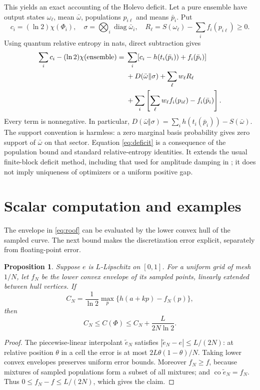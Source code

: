 \documentclass[11pt]{article}
\newtheorem{proposition}[theorem]{Proposition}
\newcommand{\co}{\operatorname{co}}
\begin{document}
This yields an exact accounting of the Holevo deficit. Let a pure ensemble have output states $\omega_\ell$, mean $\bar\omega$, populations $p_{i\ell}$ and means $\bar p_i$. Put
\[
 c_i=(\ln2)\chi(\Phi_i),\quad
 \sigma=\bigotimes_i\operatorname{diag}\bar\omega_i,\quad
 R_\ell=S(\omega_\ell)-\sum_i f_i(p_{i\ell})\ge0.
\]
Using quantum relative entropy in nats, direct subtraction gives
\begin{align}\label{eq:deficit}
 \sum_i c_i-(\ln2)\chi(\text{ensemble})
 ={}&\sum_i[c_i-h(t_i(\bar p_i))+f_i(\bar p_i)]\notag\\
 &+D(\bar\omega\Vert\sigma)+\sum_\ell w_\ell R_\ell\\
 &+\sum_i\left[\sum_\ell w_\ell f_i(p_{i\ell})-f_i(\bar p_i)\right].\notag
\end{align}
Every term is nonnegative. In particular,
$D(\bar\omega\Vert\sigma)=\sum_i h(t_i(\bar p_i))-S(\bar\omega)$.
The support convention is harmless: a zero marginal basis probability gives zero support of $\bar\omega$ on that sector. Equation \eqref{eq:deficit} is a consequence of the population bound and standard relative-entropy identities. It extends the usual finite-block deficit method, including that used for amplitude damping in \cite{tang}; it does not imply uniqueness of optimizers or a uniform positive gap.

\section{Scalar computation and examples}
The envelope in \eqref{eq:roof} can be evaluated by the lower convex hull of the sampled curve. The next bound makes the discretization error explicit, separately from floating-point error.

\begin{proposition}\label{prop:grid}
Suppose $e$ is $L$-Lipschitz on $[0,1]$. For a uniform grid of mesh $1/N$, let $f_N$ be the lower convex envelope of its sampled points, linearly extended between hull vertices. If
\[
 C_N=\frac1{\ln2}\max_p\{h(a+kp)-f_N(p)\},
\]
then
\[
 C_N\le C(\Phi)\le C_N+\frac{L}{2N\ln2}.
\]
\end{proposition}
\begin{proof}
The piecewise-linear interpolant $\widetilde e_N$ satisfies
$|\widetilde e_N-e|\le L/(2N)$: at relative position $\theta$ in a cell the error is at most $2L\theta(1-\theta)/N$.
Taking lower convex envelopes preserves uniform error bounds. Moreover $f_N\ge f$, because mixtures of sampled populations form a subset of all mixtures; and $\co\widetilde e_N=f_N$. Thus
$0\le f_N-f\le L/(2N)$, which gives the claim.
\end{proof}
\end{document}
